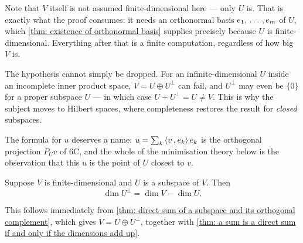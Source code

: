 \begin{ainote}
  Note that $V$ itself is not assumed finite-dimensional here --- only $U$ is. That is exactly what the proof consumes: it needs an orthonormal basis $e_1, {\, \ldots \,\,}, e_m$ of $U$, which \ref{thm: existence of orthonormal basis} supplies precisely because $U$ is finite-dimensional. Everything after that is a finite computation, regardless of how big $V$ is.

  The hypothesis cannot simply be dropped. For an infinite-dimensional $U$ inside an incomplete inner product space, $V = U \oplus U^{\bot}$ can fail, and $U^{\bot}$ may even be $\{0\}$ for a proper subspace $U$ --- in which case $U + U^{\bot} = U \neq V$. This is why the subject moves to Hilbert spaces, where completeness restores the result for \emph{closed} subspaces.

  The formula for $u$ deserves a name: $u = \sum_k \ip{v}{e_k} e_k$ is the orthogonal projection $P_U v$ of 6C, and the whole of the minimisation theory below is the observation that this $u$ is the point of $U$ closest to $v$.
\end{ainote}

\begin{thm}
  Suppose $V$ is finite-dimensional and $U$ is a subspace of $V$. Then
  \[
    \dim U^{\bot} = \dim V - \dim U.
  \]
\end{thm}
\begin{prf}
  This follows immediately from \ref{thm: direct sum of a subspace and its orthogonal complement}, which gives $V = U \oplus U^\bot$, together with \ref{thm: a sum is a direct sum if and only if the dimensions add up}.
\end{prf}

